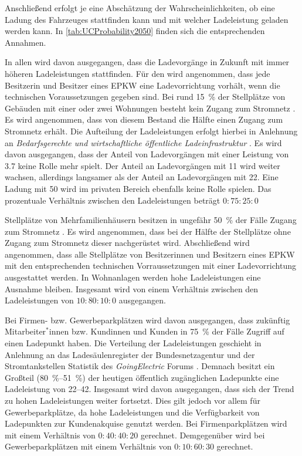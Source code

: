 Anschließend erfolgt je \UC eine Abschätzung der Wahrscheinlichkeiten, ob eine Ladung des Fahrzeuges stattfinden kann und mit welcher Ladeleistung geladen werden kann.
In \autoref{tab:UCProbability2050} finden sich die entsprechenden Annahmen.



In allen \UCs wird davon ausgegangen, dass die Ladevorgänge in Zukunft mit immer höheren Ladeleistungen stattfinden.
Für den \UC \Eigenheim wird angenommen, dass jede Besitzerin und Besitzer eines \gls{EPKW} eine Ladevorrichtung vorhält, wenn die technischen Voraussetzungen gegeben sind.
Bei rund \SI{15}{\percent} der Stellplätze von Gebäuden mit einer oder zwei Wohnungen besteht kein Zugang zum Stromnetz \cite{dena2020}.
Es wird angenommen, dass von diesem Bestand die Hälfte einen Zugang zum Stromnetz erhält.
Die Aufteilung der Ladeleistungen erfolgt hierbei in Anlehnung an \textit{Bedarfsgerechte und wirtschaftliche öffentliche Ladeinfrastruktur} \cite{NPZMAVE2020}.
Es wird davon ausgegangen, dass der Anteil von Ladevorgängen mit einer Leistung von \SI{3.7}{\kw} keine Rolle mehr spielt.
Der Anteil an Ladevorgängen mit \SI{11}{\kw} wird weiter wachsen, allerdings langsamer als der Anteil an Ladevorgängen mit \SI{22}{\kw}.
Eine Ladung mit \SI{50}{\kw} wird im privaten Bereich ebenfalls keine Rolle spielen.
Das prozentuale Verhältnis zwischen den Ladeleistungen beträgt \(0:75:25:0\)\medskip

Stellplätze von Mehrfamilienhäusern besitzen in ungefähr \SI{50}{\percent} der Fälle Zugang zum Stromnetz \cite{dena2020}.
Es wird angenommen, dass bei der Hälfte der Stellplätze ohne Zugang zum Stromnetz dieser nachgerüstet wird.
Abschließend wird angenommen, dass alle Stellplätze von Besitzerinnen und Besitzern eines \gls{EPKW} mit den entsprechenden technischen Vorraussetzungen mit einer Ladevorrichtung ausgestattet werden.
In Wohnanlagen werden hohe Ladeleistungen eine Ausnahme bleiben.
Insgesamt wird von einem Verhältnis zwischen den Ladeleistungen von \(10:80:10:0\) ausgegangen.\medskip

Bei Firmen- bzw. Gewerbeparkplätzen wird davon ausgegangen, dass zukünftig Mitarbeiter$^*$innen bzw. Kundinnen und Kunden in \SI{75}{\percent} der Fälle Zugriff auf einen Ladepunkt haben.
Die Verteilung der Ladeleistungen geschieht in Anlehnung an das Ladesäulenregister der Bundesnetzagentur \cite[][Stand: ]{BundesnetzagenturElektrizitaet2020} und der Stromtankstellen Statistik des \textit{GoingElectric} Forums \cite[][Stand: ]{Weemaes2020}.
Demnach besitzt ein Großteil (\SIrange[range-phrase=~bzw.~]{80}{51}{\percent}) der heutigen öffentlich zugänglichen Ladepunkte eine Ladeleistung von \SIrange{22}{42}{\kw}.
Insgesamt wird davon ausgegangen, dass sich der Trend zu hohen Ladeleistungen weiter fortsetzt.
Dies gilt jedoch vor allem für Gewerbeparkplätze, da hohe Ladeleistungen und die Verfügbarkeit von Ladepunkten zur Kundenakquise genutzt werden.
Bei Firmenparkplätzen wird mit einem Verhältnis von \(0:40:40:20\) gerechnet.
Demgegenüber wird bei Gewerbeparkplätzen mit einem Verhältnis von \(0:10:60:30\) gerechnet.\medskip

